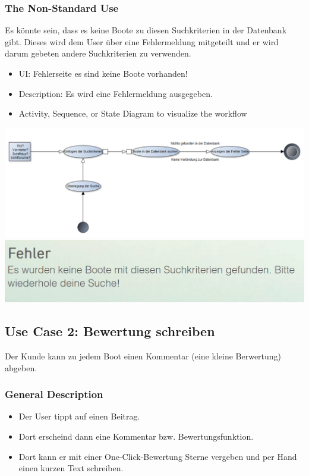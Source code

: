 \documentclass[12pt]{article}
\theoremstyle{definition}
\begin{document}
\subsubsection{The Non-Standard Use}
Es könnte sein, dass es keine Boote zu diesen Suchkriterien in der Datenbank gibt. Dieses wird dem User über eine Fehlermeldung mitgeteilt und er wird darum gebeten andere Suchkriterien zu verwenden.
\begin{itemize}
	\item UI: Fehlerseite es sind keine Boote vorhanden!
	\item Description: Es wird eine Fehlermeldung ausgegeben.
	\item Activity, Sequence, or State Diagram to visualize the workflow
\end{itemize}
\includegraphics[height=0.40\textwidth]{Boote_Suchen_Fehler.PNG}
\includegraphics[height=0.40\textwidth]{Fehler_Suchen.PNG}
\pagebreak

\subsection{Use Case 2: Bewertung schreiben}
Der Kunde kann zu jedem Boot einen Kommentar (eine kleine Berwertung) abgeben.
\subsubsection{General Description}
	\begin{itemize}
		\item Der User tippt auf einen Beitrag.
		\item Dort erscheind dann eine Kommentar bzw. Bewertungsfunktion.
		\item Dort kann er mit einer One-Click-Bewertung Sterne vergeben und per Hand einen kurzen Text schreiben.
	\end{itemize}
\end{document}
